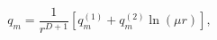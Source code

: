 \begin{equation}\label{renEMTpuremon}
q_m =\frac{1}{r^{D+1}}\left[ q_m^{(1)}+q_m^{(2)}\ln (\mu r)\right]
,
\end{equation}

